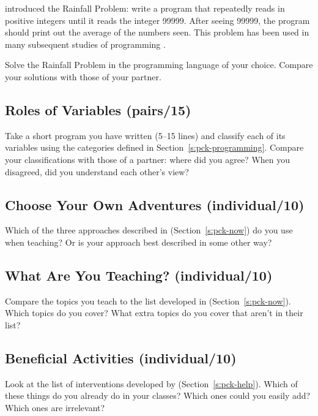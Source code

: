 \cite{Solo1986} introduced the Rainfall Problem: write a program that
repeatedly reads in positive integers until it reads the integer 99999.
After seeing 99999, the program should print out the average of the
numbers seen. This problem has been used in many subsequent studies of
programming \cite{Fisl2014,Simo2013,Sepp2015}.

Solve the Rainfall Problem in the programming language of your choice.
Compare your solutions with those of your partner.

\subsection{Roles of Variables (pairs/15)}\label{roles-of-variables-pairs15}

Take a short program you have written (5--15 lines) and classify each of
its variables using the categories defined in
Section~\ref{s:pck-programming}. Compare your classifications with those
of a partner: where did you agree? When you disagreed, did you
understand each other's view?

\subsection{Choose Your Own Adventures (individual/10)}\label{choose-your-own-adventures-individual10}

Which of the three approaches described in \cite{Sorv2014}
(Section~\ref{s:pck-now}) do you use when teaching? Or is your approach
best described in some other way?

\subsection{What Are You Teaching? (individual/10)}\label{what-are-you-teaching-individual10}

Compare the topics you teach to the list developed in \cite{Luxt2017}
(Section~\ref{s:pck-now}). Which topics do you cover? What extra topics
do you cover that aren't in their list?

\subsection{Beneficial Activities (individual/10)}\label{beneficial-activities-individual10}

Look at the list of interventions developed by \cite{Viha2014}
(Section~\ref{s:pck-help}). Which of these things do you already do in
your classes? Which ones could you easily add? Which ones are
irrelevant?

